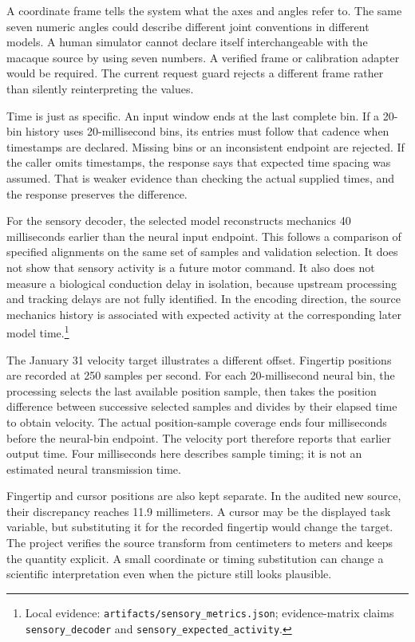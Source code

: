 A coordinate frame tells the system what the axes and angles refer to. The same seven numeric angles could describe different joint conventions in different models. A human simulator cannot declare itself interchangeable with the macaque source by using seven numbers. A verified frame or calibration adapter would be required. The current request guard rejects a different frame rather than silently reinterpreting the values.

Time is just as specific. An input window ends at the last complete bin. If a 20-bin history uses 20-millisecond bins, its entries must follow that cadence when timestamps are declared. Missing bins or an inconsistent endpoint are rejected. If the caller omits timestamps, the response says that expected time spacing was assumed. That is weaker evidence than checking the actual supplied times, and the response preserves the difference.

For the sensory decoder, the selected model reconstructs mechanics 40 milliseconds earlier than the neural input endpoint. This follows a comparison of specified alignments on the same set of samples and validation selection. It does not show that sensory activity is a future motor command. It also does not measure a biological conduction delay in isolation, because upstream processing and tracking delays are not fully identified. In the encoding direction, the source mechanics history is associated with expected activity at the corresponding later model time.\footnote{Local evidence: \texttt{artifacts/sensory\_metrics.json}; evidence-matrix claims \texttt{sensory\_decoder} and \texttt{sensory\_expected\_activity}.}

The January 31 velocity target illustrates a different offset. Fingertip positions are recorded at 250 samples per second. For each 20-millisecond neural bin, the processing selects the last available position sample, then takes the position difference between successive selected samples and divides by their elapsed time to obtain velocity. The actual position-sample coverage ends four milliseconds before the neural-bin endpoint. The velocity port therefore reports that earlier output time. Four milliseconds here describes sample timing; it is not an estimated neural transmission time.

Fingertip and cursor positions are also kept separate. In the audited new source, their discrepancy reaches 11.9 millimeters. A cursor may be the displayed task variable, but substituting it for the recorded fingertip would change the target. The project verifies the source transform from centimeters to meters and keeps the quantity explicit. A small coordinate or timing substitution can change a scientific interpretation even when the picture still looks plausible.

